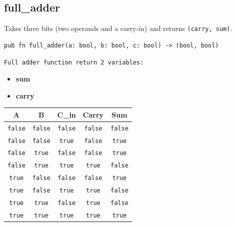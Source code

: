\documentclass[a4paper,12pt]{report}
\begin{document}
\vspace{2.5cm}

\subsection*{full\_adder}
Takes three bits (two operands and a carry-in) and returns \texttt{(carry, sum)}.

\begin{lstlisting}
pub fn full_adder(a: bool, b: bool, c: bool) -> (bool, bool)
\end{lstlisting}

\texttt{Full adder function return 2 variables:}

\begin{itemize}
    \item \textbf{sum}
    \item \textbf{carry}
\end{itemize}

\begin{center}
\begin{tabular}{|c|c|c|c|c|}
\hline
\rowcolor{gray!20} \textbf{A} & \textbf{B} & \textbf{C\_in} & \textbf{Carry} & \textbf{Sum} \\ \hline
\texttt{false} & \texttt{false} & \texttt{false} & \texttt{false} & \texttt{false} \\ \hline
\texttt{false} & \texttt{false} & \texttt{true} & \texttt{false} & \texttt{true} \\ \hline
\texttt{false} & \texttt{true} & \texttt{false} & \texttt{false} & \texttt{true} \\ \hline
\texttt{false} & \texttt{true} & \texttt{true} & \texttt{true} & \texttt{false} \\ \hline
\texttt{true} & \texttt{false} & \texttt{false} & \texttt{false} & \texttt{true} \\ \hline
\texttt{true} & \texttt{false} & \texttt{true} & \texttt{true} & \texttt{false} \\ \hline
\texttt{true} & \texttt{true} & \texttt{false} & \texttt{true} & \texttt{false} \\ \hline
\texttt{true} & \texttt{true} & \texttt{true} & \texttt{true} & \texttt{true} \\ \hline
\end{tabular}
\end{center}

\newpage

\end{document}
